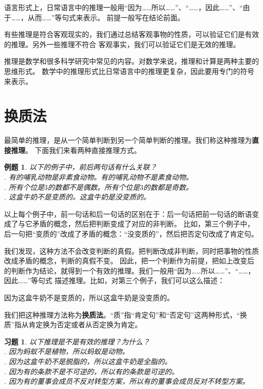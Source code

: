 \documentclass[12pt,UTF8]{ctexbook}
\newtheorem{et}{例题}[section]
\newtheorem{xt}{习题}[section]
\begin{document}
语言形式上，日常语言中的推理一般用“因为……所以……”、“……，因此……”、“由于……，从而……”等句式来表示。
前提一般写在结论前面。

有些推理是符合客观现实的，我们通过总结客观事物的性质，可以验证它们是有效的推理。另外一些推理不符合
客观事实，我们可以验证它们是无效的推理。

推理是数学和很多科学研究中常见的内容。对数学来说，推理和计算是两种主要的思维形式。
数学中的推理形式比日常语言中的推理更复杂，因此要用专门的符号来表示。

\section{换质法}

最简单的推理，是从一个简单判断到另一个简单判断的推理。我们称这种推理为\textbf{直接推理}。
下面我们来看两种直接推理方式。

\begin{et}\label{et:2b-0-0} 
    以下的例子中，前后两句话有什么关联？\\
    . 有的哺乳动物是非素食动物。有的哺乳动物不是素食动物。\\
    . 所有个位是$3$的数都不是偶数。所有个位是$3$的数都是奇数。\\
    . 这盒牛奶不是变质的。这盒牛奶是没变质的。
\end{et}
以上每个例子中，前一句话和后一句话的区别在于：后一句话把前一句话的断语变成了与它矛盾的概念，然后把判断变成了对应的非判断。
比如，第三个例子中，后一句把“变质的”改成了矛盾的概念：“没变质的”，然后把否定句改成了肯定句。

我们发现，这种方法不会改变判断的真假。把判断改成非判断，同时把事物的性质改成矛盾的概念，判断的真假不变。
因此，把一个判断作为前提，把如上改变后的判断作为结论，就得到一个有效的推理。我们一般用“因为……所以……”、“……，因此……”等句式
描述推理。比如，对第三个例子，我们可以这么描述：

因为这盒牛奶不是变质的，所以这盒牛奶是没变质的。

我们把这种推理方法称为\textbf{换质法}。“质”指“肯定句”和“否定句”这两种形式，“换质”指从肯定换为否定或者从否定换为肯定。
\begin{xt}\label{xt:2b-0-0}
    以下推理是不是有效的推理？为什么？\\
    . 因为蚂蚁不是植物，所以蚂蚁是动物。 \\
    . 因为这盒牛奶不是脱脂的，所以这盒牛奶是全脂的。 \\
    . 因为有的条款不是不可逆的，所以有的条款是可逆的。 \\
    . 因为有的董事会成员不反对转型方案，所以有的董事会成员反对不转型方案。
\end{xt}
\end{document}

